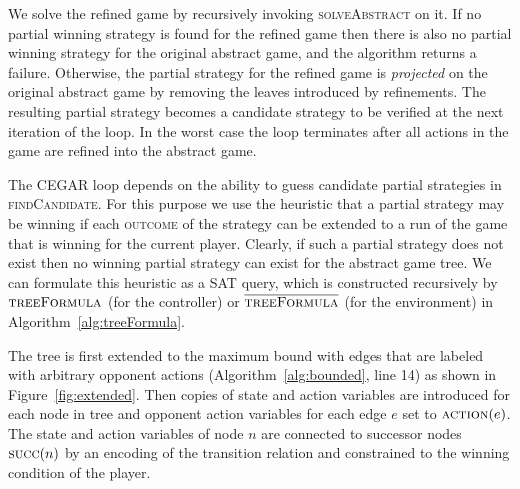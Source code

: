 \documentclass{llncs}
\newcommand{\textoverline}[1]{$\overline{\mbox{#1}}$}
\begin{document}
We solve the refined game by recursively invoking \textsc{solveAbstract} on it.
If no partial winning strategy is found for the refined game then there is also
no partial winning strategy for the original abstract game, and the algorithm
returns a failure.  Otherwise, the partial strategy for the refined game is
\emph{projected} on the original abstract game by removing the leaves
introduced by refinements. The resulting partial strategy becomes a candidate
strategy to be verified at the next iteration of the loop. In the worst case
the loop terminates after all actions in the game are refined into the abstract
game.

The CEGAR loop depends on the ability to guess candidate partial strategies in
\textsc{findCandidate}. For this purpose we use the heuristic that a partial
strategy may be winning if each \textsc{outcome} of the strategy can be
extended to a run of the game that is winning for the current player.  Clearly,
if such a partial strategy does not exist then no winning partial strategy can
exist for the abstract game tree. We can formulate this heuristic as a SAT
query, which is constructed recursively by $\textsc{treeFormula}$ (for the
controller) or $\textsc{\textoverline{treeFormula}}$ (for the environment) in
Algorithm~\ref{alg:treeFormula}.

The tree is first extended to the maximum bound with edges that are labeled
with arbitrary opponent actions (Algorithm~\ref{alg:bounded}, line 14) as shown
in Figure~\ref{fig:extended}. Then copies of state and action variables are
introduced for each node in tree and opponent action variables for each edge
$e$ set to $\textsc{action}(e)$. The state and action variables of node $n$ are
connected to successor nodes $\textsc{succ}(n)$ by an encoding of the
transition relation and constrained to the winning condition of the player.

\end{document}
